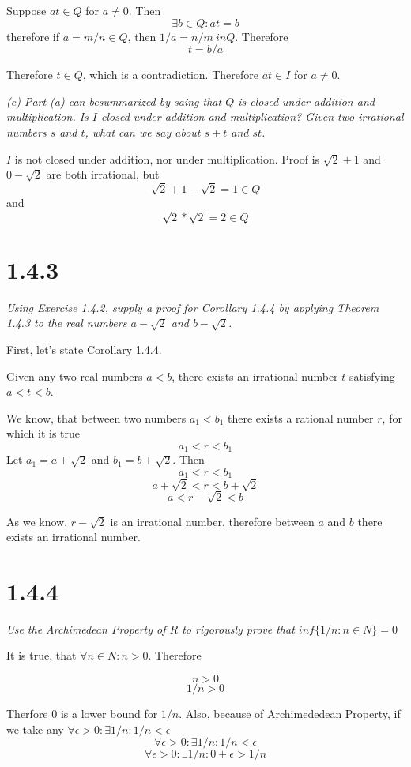 \documentclass[11pt,oneside,titlepage]{article}
\begin{document}
Suppose $at \in Q$ for $a \neq 0$. Then
$$\exists b \in Q: at = b $$
therefore if $a = m/n \in Q$, then $1/a = n / m \ in Q$. Therefore
$$t = b/a$$

Therefore $t \in Q$, which is a contradiction. Therefore $at \in I$ for
$a \neq 0$.

\textit{(c) Part (a) can besummarized by saing that $Q$ is closed under
  addition and multiplication. Is $I$ closed under addition and
  multiplication? Given two irrational numbers $s$ and $t$, what can we say
  about $s + t$ and $st$.}

$I$ is not closed under addition, nor under multiplication. Proof is
$\sqrt{2} + 1$ and $0 - \sqrt{2}$ are both irrational, but
$$\sqrt{2} + 1 - \sqrt{2} = 1 \in Q$$
and
$$\sqrt{2} * \sqrt{2} = 2 \in Q$$

\section*{1.4.3}
\textit{Using Exercise 1.4.2, supply a proof for Corollary 1.4.4 by
  applying Theorem 1.4.3 to the real numbers $a - \sqrt{2}$  and
  $b - \sqrt{2}$.}

First, let's state Corollary 1.4.4.

Given any two real numbers $a < b$, there exists an irrational number $t$
satisfying $a < t < b$.

We know, that between two numbers $a_1 < b_1$ there exists a rational number
$r$, for which it is true
$$a_1 < r < b_1$$
Let $a_1 = a + \sqrt{2}$ and $b_1 = b + \sqrt{2}$. Then
$$a_1 < r < b_1$$
$$a + \sqrt{2}  < r < b + \sqrt{2}$$
$$a  < r - \sqrt{2} < b $$

As we know, $r - \sqrt{2}$ is an irrational number, therefore between $a$ and
$b$ there exists an irrational number.

\section*{1.4.4}
\textit{Use the Archimedean Property of $R$ to rigorously prove that
  $inf\{1/n: n \in N\} = 0$}

It is true, that $\forall n \in N: n > 0$. Therefore

$$n > 0$$
$$1/n > 0$$

Therfore 0 is a lower bound for $1/n$. Also, because of Archimededean Property,
if we take any $\forall \epsilon > 0: \exists 1/n: 1/n < \epsilon $
$$\forall \epsilon > 0: \exists 1/n: 1/n < \epsilon $$
$$\forall \epsilon > 0: \exists 1/n: 0 + \epsilon > 1/n $$
\end{document}
